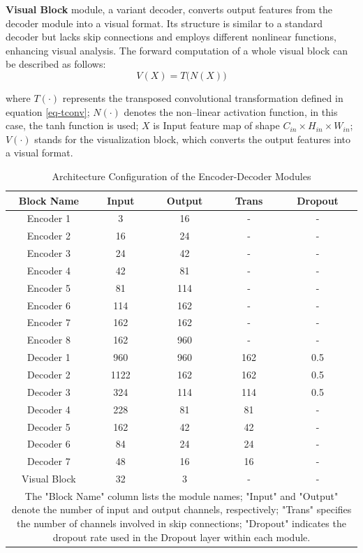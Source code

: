 \documentclass[a4paper, times, 10pt,twocolumn]{article}
\begin{document}
\textbf{Visual Block} module, a variant decoder, converts output features from the decoder module into a visual format. Its structure is similar to a standard decoder but lacks skip connections and employs different nonlinear functions, enhancing visual analysis. The forward computation of a whole visual block can be described as follows:
\begin{equation}
	\label{eq-visual}
	V(X) =  T \bigl( N(X) \bigr)
\end{equation}

where
$T(\cdot)$ represents the transposed convolutional transformation defined in equation \eqref{eq-tconv};
$N(\cdot)$ denotes the non--linear activation function, in this case, the tanh function is used;
$X$ is Input feature map of shape $C_{in} \times H_{in} \times W_{in}$;
$V(\cdot)$ stands for the visualization block, which converts the output features into a visual format.


\begin{table}[h]
	\caption{Architecture Configuration of the Encoder-Decoder Modules}
	\label{tab:encoder_setting}
	\begin{tabular}{ccccc}
		\hline
		Block Name   & Input & Output & Trans & Dropout \\
		\hline
		Encoder 1    & 3     & 16     & -     & -       \\
		Encoder 2    & 16    & 24     & -     & -       \\
		Encoder 3    & 24    & 42     & -     & -       \\
		Encoder 4    & 42    & 81     & -     & -       \\
		Encoder 5    & 81    & 114    & -     & -       \\
		Encoder 6    & 114   & 162    & -     & -       \\
		Encoder 7    & 162   & 162    & -     & -       \\
		Encoder 8    & 162   & 960    & -     & -       \\
		Decoder 1    & 960   & 960    & 162   & 0.5     \\
		Decoder 2    & 1122  & 162    & 162   & 0.5     \\
		Decoder 3    & 324   & 114    & 114   & 0.5     \\
		Decoder 4    & 228   & 81     & 81    & -       \\
		Decoder 5    & 162   & 42     & 42    & -       \\
		Decoder 6    & 84    & 24     & 24    & -       \\
		Decoder 7    & 48    & 16     & 16    & -       \\
		Visual Block & 32    & 3      & -     & -       \\
		\hline
		\multicolumn{5}{p{244pt}}{The "Block Name" column lists the module names; "Input" and "Output" denote the number of input and output channels, respectively; "Trans" specifies the number of channels involved in skip connections; "Dropout" indicates the dropout rate used in the Dropout layer within each module.}
	\end{tabular}
\end{table}
\end{document}

